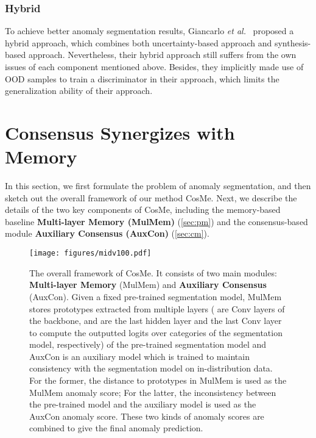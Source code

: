 \documentclass[10pt,twocolumn,letterpaper]{article}
\begin{document}
\subsubsection{Hybrid}
To achieve better anomaly segmentation results, Giancarlo \emph{et al.}~\cite{synboost} proposed a hybrid approach, which combines both uncertainty-based approach and synthesis-based approach. Nevertheless, their hybrid approach still suffers from the own issues of each component mentioned above. Besides, they implicitly made use of OOD samples to train a discriminator in their approach, which limits the generalization ability of their approach.










\section{Consensus Synergizes with Memory}

In this section, we first formulate the problem of anomaly segmentation, and then sketch out the overall framework of our method CosMe. Next, we describe the details of the two key components of CosMe, including the memory-based baseline \textbf{Multi-layer Memory (MulMem)} (\cref{sec:pm}) and the consensus-based module \textbf{Auxiliary Consensus (AuxCon)} (\cref{sec:cm}).

\begin{figure*}
  \centering
    \texttt{[image: figures/midv100.pdf]}
    \caption{The overall framework of CosMe. It consists of two main modules: \textbf{Multi-layer Memory} (MulMem) and \textbf{Auxiliary Consensus} (AuxCon). Given a fixed pre-trained segmentation model, MulMem stores prototypes extracted from multiple layers ( are Conv layers of the backbone,  and  are the last hidden layer and  the last  Conv layer to compute the outputted logits over categories of the segmentation model, respectively) of the pre-trained segmentation model and AuxCon is an auxiliary model which is trained to maintain consistency with the segmentation model on in-distribution data. For the former, the distance to prototypes in MulMem is used as the MulMem anomaly score; For the latter, the inconsistency between the pre-trained model and the auxiliary model is used as the AuxCon anomaly score. These two kinds of anomaly scores     are combined to give the final anomaly prediction.
    }
  \label{fig:framework}
\end{figure*}
\end{document}
